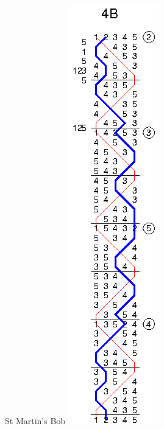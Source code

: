 \begin{figure}[t]
\begin{minipage}[t]{0.24\textwidth}
  \end{minipage}
  \begin{minipage}[t]{0.24\textwidth}
    \centering
    St Martin's Bob
    \includegraphics{figs/methods/single-hunt/4B}
  \end{minipage}
\end{figure}
